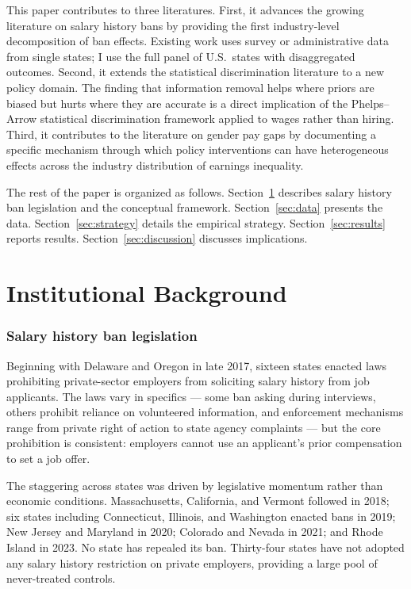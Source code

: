 \documentclass[12pt]{article}
\begin{document}
This paper contributes to three literatures. First, it advances the growing literature on salary history bans \citep{BarachHorton2021, AganStarr2022, HansenMcNichols2020} by providing the first industry-level decomposition of ban effects. Existing work uses survey or administrative data from single states; I use the full panel of U.S.\ states with disaggregated outcomes. Second, it extends the statistical discrimination literature \citep{DoleacHansen2020, AganStarr2018} to a new policy domain. The finding that information removal helps where priors are biased but hurts where they are accurate is a direct implication of the Phelps--Arrow statistical discrimination framework applied to wages rather than hiring. Third, it contributes to the literature on gender pay gaps \citep{GoldinKatz2016, Blau2017, Olivetti2016} by documenting a specific mechanism through which policy interventions can have heterogeneous effects across the industry distribution of earnings inequality.

The rest of the paper is organized as follows. Section~\ref{sec:background} describes salary history ban legislation and the conceptual framework. Section~\ref{sec:data} presents the data. Section~\ref{sec:strategy} details the empirical strategy. Section~\ref{sec:results} reports results. Section~\ref{sec:discussion} discusses implications.


\section{Institutional Background}
\label{sec:background}

\subsubsection*{Salary history ban legislation} Beginning with Delaware and Oregon in late 2017, sixteen states enacted laws prohibiting private-sector employers from soliciting salary history from job applicants. The laws vary in specifics --- some ban asking during interviews, others prohibit reliance on volunteered information, and enforcement mechanisms range from private right of action to state agency complaints --- but the core prohibition is consistent: employers cannot use an applicant's prior compensation to set a job offer.

The staggering across states was driven by legislative momentum rather than economic conditions. Massachusetts, California, and Vermont followed in 2018; six states including Connecticut, Illinois, and Washington enacted bans in 2019; New Jersey and Maryland in 2020; Colorado and Nevada in 2021; and Rhode Island in 2023. No state has repealed its ban. Thirty-four states have not adopted any salary history restriction on private employers, providing a large pool of never-treated controls.
\end{document}
